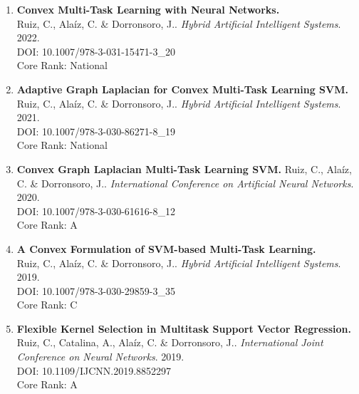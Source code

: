 \begin{enumerate}
    \item \textbf{Convex Multi-Task Learning with Neural Networks.}\\
    {Ruiz, C.}, Alaíz, C. \& Dorronsoro, J.. 
    \emph{Hybrid Artificial Intelligent Systems}. 2022.\\
    DOI: 10.1007/978-3-031-15471-3\_20\\
    Core Rank: National
    \item \textbf{Adaptive Graph Laplacian for Convex Multi-Task Learning SVM.}\\
    {Ruiz, C.}, Alaíz, C. \& Dorronsoro, J.. 
    \emph{Hybrid Artificial Intelligent Systems}. 2021.\\
    DOI: 10.1007/978-3-030-86271-8\_19\\
    Core Rank: National
    \item \textbf{Convex Graph Laplacian Multi-Task Learning SVM.}
    {Ruiz, C.}, Alaíz, C. \& Dorronsoro, J.. 
    \emph{International Conference on Artificial Neural Networks}. 2020.\\
    DOI: 10.1007/978-3-030-61616-8\_12\\
    Core Rank: A
    \item \textbf{A Convex Formulation of SVM-based Multi-Task Learning.}\\
    {Ruiz, C.}, Alaíz, C. \& Dorronsoro, J.. 
    \emph{Hybrid Artificial Intelligent Systems}. 2019.\\
    DOI: 10.1007/978-3-030-29859-3\_35\\
    Core Rank: C
    \item \textbf{Flexible Kernel Selection in Multitask
    Support Vector Regression.}\\
    Ruiz, C., Catalina, A., Alaíz, C. \& Dorronsoro, J.. 
    \emph{International Joint Conference on Neural Networks}. 2019.\\
    DOI: 10.1109/IJCNN.2019.8852297\\
    Core Rank: A
\end{enumerate}
%
